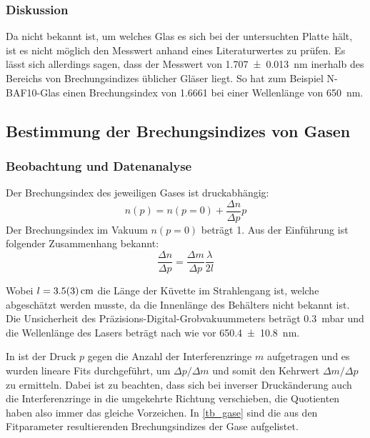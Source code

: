 \documentclass[
	a4paper,
	12pt,
	pagesize,
	ngerman
]{scrartcl}
\begin{document}
	\subsubsection{Diskussion}
	Da nicht bekannt ist, um welches Glas es sich bei der untersuchten Platte hält, ist es nicht möglich den Messwert anhand eines Literaturwertes zu prüfen.
	Es lässt sich allerdings sagen, dass der Messwert von \SI{1.707+-0.013}{nm} inerhalb des Bereichs von Brechungsindizes üblicher Gläser liegt.
	So hat zum Beispiel N-BAF10-Glas einen Brechungsindex von \SI{1,6661}{} bei einer Wellenlänge von \SI{650}{nm}.\cite{Brechungsindizes}

	\subsection{Bestimmung der Brechungsindizes von Gasen}
	\subsubsection{Beobachtung und Datenanalyse}
	Der Brechungsindex des jeweiligen Gases ist druckabhängig:
	\begin{equation}
		n(p) = n(p=0) + \frac{\Delta n}{\Delta p}p
		\label{eq_brech_p}
	\end{equation}
	Der Brechungsindex im Vakuum $n(p=0)$ beträgt 1.
	Aus der Einführung ist folgender Zusammenhang bekannt: %
	\begin{equation}
			\frac{\Delta n}{\Delta p} = \frac{\Delta m}{\Delta p} \frac{\lambda}{2l}
	\end{equation}

	Wobei $l=\SI{3.5+-0.3}{cm}$ die Länge der Küvette im Strahlengang ist, welche abgeschätzt werden musste, da die Innenlänge des Behälters nicht bekannt ist.
	Die Unsicherheit des Präzisions-Digital-Grobvakuummeters beträgt \SI{0.3}{mbar} und die Wellenlänge des Lasers beträgt nach wie vor \SI{650.4+-10.8}{nm}.

	In  ist der Druck $p$ gegen die Anzahl der Interferenzringe $m$ aufgetragen und es wurden lineare Fits durchgeführt, um $\Delta p / \Delta m$ und somit den Kehrwert $\Delta m / \Delta p$ zu ermitteln.
	Dabei ist zu beachten, dass sich bei inverser Druckänderung auch die Interferenzringe in die umgekehrte Richtung verschieben, die Quotienten haben also immer das gleiche Vorzeichen.
	In \cref{tb_gase} sind die aus den Fitparameter resultierenden Brechungsindizes der Gase aufgelistet.
\end{document}
